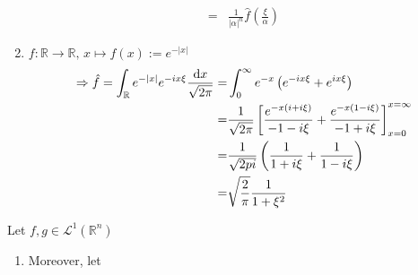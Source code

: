 \begin{example}
\begin{enumerate}
\begin{align}
            =& \frac{1}{|\alpha|^n} \hat{f} \left( \frac{\xi}{\alpha} \right)
        \end{align}
        \item \(f: \mathbb{R} \rightarrow \mathbb{R}, \, x \mapsto f(x) := e^{-|x|}\)
        \begin{align}
            \Rightarrow \hat{f} = \int_{\mathbb{R}} e^{-|x|} e^{-ix\xi} \frac{\mathop{}\!\mathrm{d} x}{\sqrt{2 \pi}} =& \int_0^\infty e^{-x} \left( e^{-ix\xi} + e^{ix\xi} \right) \\
            =& \frac{1}{\sqrt{2\pi}} \left[ \frac{e^{-x(i + i\xi)}}{-1-i\xi} + \frac{e^{-x(1-i\xi)}}{-1+i\xi} \right]_{x=0}^{x=\infty} \\
            =& \frac{1}{\sqrt{2pi}} \left(\frac{1}{1 + i\xi} + \frac{1}{1-i\xi}\right) \\
            =& \sqrt{\frac{2}{\pi}} \frac{1}{1 + \xi^2}
        \end{align}
    \end{enumerate}
\end{example}
\begin{proposition}
    Let \(f, g \in \mathcal{L}^1 (\mathbb{R}^n)\)
    \begin{enumerate}
        \item Moreover, let \(\)
    \end{enumerate}
\end{proposition}